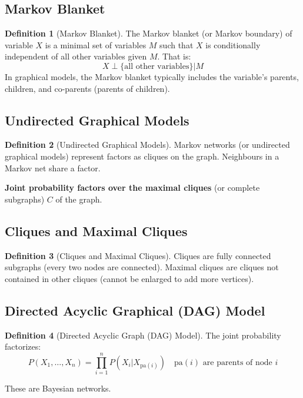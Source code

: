 \documentclass[12pt,a4paper]{article}
\theoremstyle{definition}
\newtheorem{definition}{Definition}[section]
\begin{document}
\subsection{Markov Blanket}

\begin{definition}[Markov Blanket]
The Markov blanket (or Markov boundary) of variable $X$ is a minimal set of variables $M$ such that $X$ is conditionally independent of all other variables given $M$. That is:
\[
X \perp \{\text{all other variables}\} | M
\]
In graphical models, the Markov blanket typically includes the variable's parents, children, and co-parents (parents of children).
\end{definition}

\subsection{Undirected Graphical Models}

\begin{definition}[Undirected Graphical Models]
Markov networks (or undirected graphical models) represent factors as cliques on the graph. Neighbours in a Markov net share a factor.

\textbf{Joint probability factors over the maximal cliques} (or complete subgraphs) $C$ of the graph.
\end{definition}

\subsection{Cliques and Maximal Cliques}

\begin{definition}[Cliques and Maximal Cliques]
Cliques are fully connected subgraphs (every two nodes are connected). Maximal cliques are cliques not contained in other cliques (cannot be enlarged to add more vertices).
\end{definition}

\subsection{Directed Acyclic Graphical (DAG) Model}

\begin{definition}[Directed Acyclic Graph (DAG) Model]
The joint probability factorizes:
\[
P(X_1, \ldots, X_n) = \prod_{i=1}^n P(X_i | X_{\text{pa}(i)}) \quad \text{pa}(i) \text{ are parents of node } i
\]

These are Bayesian networks.
\end{definition}
\end{document}
